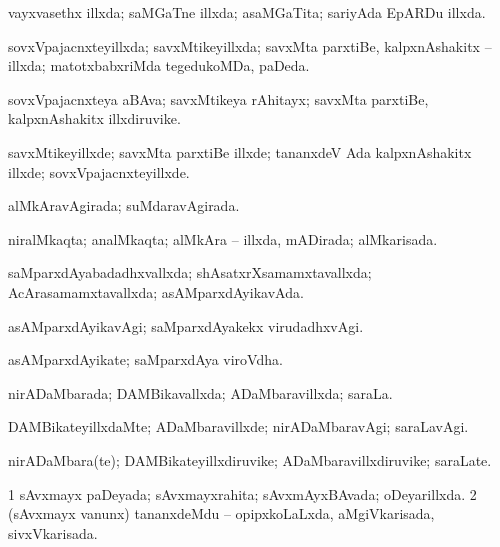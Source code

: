 {{\bentry
{} 
\gl{\gu}
\expl{}
\bmng
vayxvasethx illxda; saMGaTne illxda; asaMGaTita; sariyAda EpARDu illxda. 
\emng
\eentry

\bentry
{} 
\gl{\gu}
\expl{}
\bmng
sovxVpajacnxteyillxda; savxMtikeyillxda; savxMta parxtiBe, kalpxnAshakitx -- illxda; matotxbabxriMda tegedukoMDa, paDeda. 
\emng
\eentry

\bentry
{} 
\gl{\nA}
\expl{}
\bmng
sovxVpajacnxteya aBAva; savxMtikeya rAhitayx; savxMta parxtiBe, kalpxnAshakitx illxdiruvike. 
\emng
\eentry

\bentry
{} 
\gl{\kirxvi}
\expl{}
\bmng
savxMtikeyillxde; savxMta parxtiBe illxde; tananxdeV Ada kalpxnAshakitx illxde; sovxVpajacnxteyillxde. 
\emng
\eentry

\bentry
{} 
\gl{\gu}
\expl{}
\bmng
alMkAravAgirada; suMdaravAgirada. 
\emng
\eentry

\bentry
{} 
\gl{\gu}
\expl{}
\bmng
niralMkaqta; analMkaqta; alMkAra -- illxda, mADirada; alMkarisada. 
\emng
\eentry

\bentry
{} 
\gl{\gu}
\expl{}
\bmng
saMparxdAyabadadhxvallxda; shAsatxrXsamamxtavallxda; AcArasamamxtavallxda; asAMparxdAyikavAda. 
\emng
\eentry

\bentry
{} 
\gl{\kirxvi}
\expl{}
\bmng
asAMparxdAyikavAgi; saMparxdAyakekx virudadhxvAgi. 
\emng
\eentry

\bentry
{} 
\gl{\nA}
\expl{}
\bmng
asAMparxdAyikate; saMparxdAya viroVdha. 
\emng
\eentry

\bentry
{} 
\gl{\nA}
\expl{}
\bmng
nirADaMbarada; DAMBikavallxda; ADaMbaravillxda; saraLa. 
\emng
\eentry

\bentry
{} 
\gl{\kirxvi}
\expl{}
\bmng
DAMBikateyillxdaMte; ADaMbaravillxde; nirADaMbaravAgi; saraLavAgi. 
\emng
\eentry

\bentry
{} 
\gl{\nA}
\expl{}
\bmng
nirADaMbara(te); DAMBikateyillxdiruvike; ADaMbaravillxdiruvike; saraLate. 
\emng
\eentry

\bentry
{} 
\gl{\gu}
\bmng
\bnum
\num{1} sAvxmayx paDeyada; sAvxmayxrahita; sAvxmAyxBAvada; oDeyarillxda. 
\num{2} (sAvxmayx \mo vanunx) tananxdeMdu -- opipxkoLaLxda, aMgiVkarisada, sivxVkarisada. 
\enum
\emng
\eentry

}}
